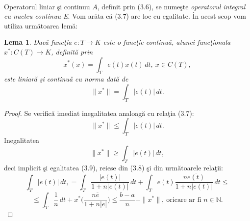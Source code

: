 \documentclass[a4paper,openany,12pt]{report}
\newtheorem{lemma}{Lema}[section]
\begin{document}
\paragraph*{}Operatorul liniar \c si continuu $A$, definit prin (3.6), se nume\c ste \textit{operatorul integral cu nucleu continuu E}. Vom ar\u ata c\u a (3.7) are loc cu egalitate. \^ In acest scop vom utiliza urm\u atoarea lem\u a:
\begin{lemma}
Dac\u a func\c tia $e: T\rightarrow K$ este o func\c tie continu\u a, atunci func\c tionala $x^* : C(T)\rightarrow K$, definit\u a prin
\begin{equation}
x^*(x)=\int_Te(t)x(t)\, dt, \: x \in C(T),
\end{equation}
este liniar\u a \c si continu\u a cu norma dat\u a de
\begin{equation}
\|x^*\|=\int_T \left| e(t)\right| \, dt.
\end{equation}
\end{lemma}
\begin{proof}
Se verific\u a imediat inegalitatea analoag\u a cu rela\c tia (3.7):
\begin{equation*}
\|x^*\| \leq \int_T \left| e(t)\right| \, dt.
\end{equation*}
Inegalitatea 
\begin{equation*}
\|x^*\| \geq \int_T \left| e(t)\right| \, dt,
\end{equation*}
deci implicit \c si egalitatea (3.9), reiese din (3.8) \c si din urm\u atoarele rela\c tii:
\begin{equation*}
\int_T \left| e(t)\right| \, dt, = \int_T \frac{\left| e(t)\right|}{1+n\left| e(t)\right|} \, dt + \int_T e(t) \frac{n\overline{e(t)}}{1+n\left| e(t)\right|}\, dt \leq
\end{equation*}
\begin{equation*}
\leq\int_T \frac{1}{n}\, dt + x^*\bigg(\frac{n\overline{e}}{1+n\left| e\right|}\bigg) \leq \frac{b-a}{n} + \|x^*\|,\: \text{oricare ar fi } n\in\mathbb{N}.
\end{equation*}
\end{proof}
\end{document}
